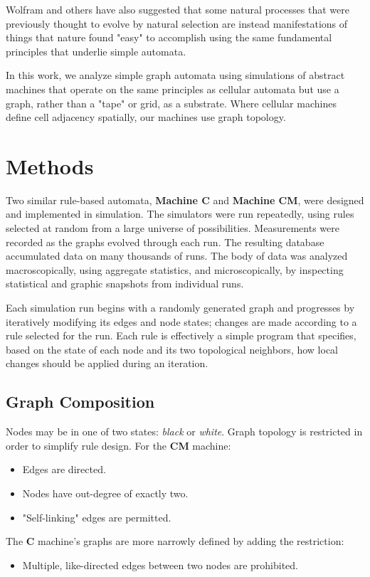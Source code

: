 \documentclass{tufte-handout}
\begin{document}
Wolfram and others have also suggested that some natural processes that were
previously thought to evolve by natural selection are instead
manifestations of things that nature found "easy" to accomplish using
the same fundamental principles that underlie simple automata.

In this work, we analyze simple graph automata using simulations of abstract
machines that operate on the same principles as
cellular automata but use a graph, rather than a "tape" or grid, as a substrate.
Where cellular machines define cell adjacency spatially, our machines use graph topology.


\section{Methods}

Two similar rule-based automata, \textbf{Machine C} and \textbf{Machine CM}, were designed
and implemented in simulation. The simulators were run repeatedly, using rules
selected at random from a large universe of possibilities. Measurements were recorded as the graphs
evolved through each run. The resulting database accumulated data on many thousands of runs. The body of data
was analyzed macroscopically, using aggregate statistics, and microscopically, by inspecting
statistical and graphic snapshots from individual runs.

Each simulation run begins with a randomly generated graph and progresses by
iteratively modifying its edges and node states; changes are made according to a rule selected
for the run. Each rule is effectively a simple program  that specifies, based on the state
of each node and its two topological neighbors, how local changes should be applied during an
iteration.

\subsection{Graph Composition}

Nodes may be in one of two states: \textit{black} or \textit{white}.
Graph topology is restricted in order to simplify rule design. For the
\textbf{CM} machine:

\vspace{1mm}
\begin{itemize}
\setlength{\itemindent}{2em}
    \item Edges are directed.
    \item Nodes have out-degree of exactly two.
    \item "Self-linking" edges are permitted.
\end{itemize}
\vspace{2mm}
The \textbf{C}  machine's graphs are more narrowly defined by adding the
restriction:
\begin{itemize} 
\setlength{\itemindent}{2em}
    \item Multiple, like-directed edges between two nodes are prohibited.
\end{itemize}
\vspace{2mm}
\end{document}
